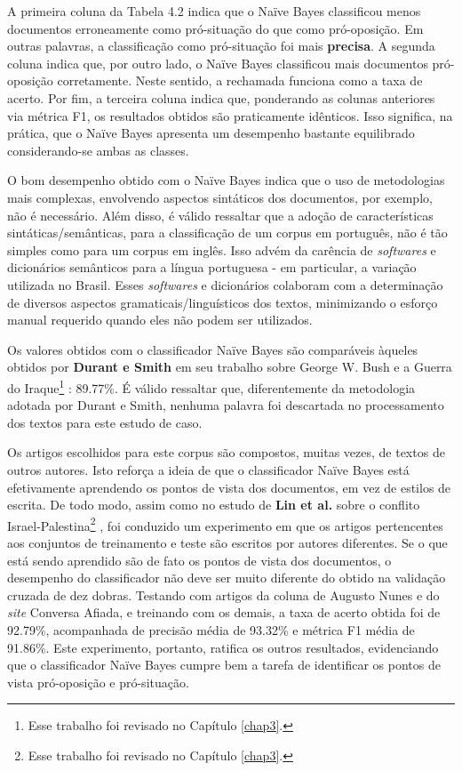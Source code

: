A primeira coluna da Tabela 4.2 indica que o Naïve Bayes classificou menos documentos erroneamente como pró-situação do que como pró-oposição. Em outras palavras, a classificação como pró-situação foi mais \textbf{precisa}. A segunda coluna indica que, por outro lado, o Naïve Bayes classificou mais documentos pró-oposição corretamente. Neste sentido, a rechamada funciona como a taxa de acerto. Por fim, a terceira coluna indica que, ponderando as colunas anteriores via métrica F1, os resultados obtidos são praticamente idênticos. Isso significa, na prática, que o Naïve Bayes apresenta um desempenho bastante equilibrado considerando-se ambas as classes. 

O bom desempenho obtido com o Naïve Bayes indica que o uso de metodologias mais complexas, envolvendo aspectos sintáticos dos documentos, por exemplo, não é necessário. Além disso, é válido ressaltar que a adoção de características sintáticas/semânticas, para a classificação de um corpus em português, não é tão simples como para um corpus em inglês. Isso advém  da carência de \emph{softwares} e dicionários semânticos para a língua portuguesa - em particular, a variação utilizada no Brasil. Esses \emph{softwares} e dicionários colaboram com a determinação de diversos aspectos gramaticais/linguísticos dos textos, minimizando o esforço manual requerido quando eles não podem ser utilizados.


Os valores obtidos com o classificador Naïve Bayes são comparáveis àqueles obtidos por \textbf{Durant e Smith} em seu trabalho sobre George W. Bush e a Guerra do Iraque\footnote{Esse trabalho foi revisado no Capítulo \ref{chap3}.} \cite{durant-smith}: 89.77\%. É válido ressaltar que, diferentemente da metodologia adotada por Durant e Smith, nenhuma palavra foi descartada no processamento dos textos para este estudo de caso.  

Os artigos escolhidos para este corpus são compostos, muitas vezes, de textos de outros autores. Isto reforça a ideia de que o classificador Naïve Bayes está efetivamente aprendendo os pontos de vista dos documentos, em vez de estilos de escrita. De todo modo, assim como no estudo de \textbf{Lin et al.} sobre o conflito Israel-Palestina\footnote{Esse trabalho foi revisado no Capítulo \ref{chap3}.} \cite{lin-et-al2006}, foi conduzido um experimento em que os artigos pertencentes aos conjuntos de treinamento e teste são escritos por autores diferentes. Se o que está sendo aprendido são de fato os pontos de vista dos documentos, o desempenho do classificador não deve ser muito diferente do obtido na validação cruzada de dez dobras. Testando com artigos da coluna de Augusto Nunes e do \emph{site} Conversa Afiada, e treinando com os demais, a taxa de acerto obtida foi de 92.79\%, acompanhada de precisão média de 93.32\% e métrica F1 média de 91.86\%. Este experimento, portanto, ratifica os outros resultados, evidenciando que o classificador Naïve Bayes cumpre bem a tarefa de identificar os pontos de vista pró-oposição e pró-situação.

